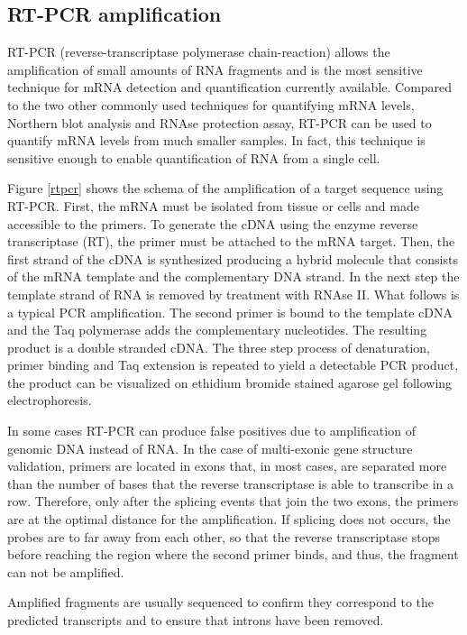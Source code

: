 \subsection{RT-PCR amplification}

RT-PCR (reverse-transcriptase polymerase chain-reaction) allows the
amplification of small amounts of RNA fragments and is the most
sensitive technique for mRNA detection and quantification currently
available. Compared to the two other commonly used techniques for
quantifying mRNA levels, Northern blot analysis and RNAse protection
assay, RT-PCR can be used to quantify mRNA levels from much smaller
samples. In fact, this technique is sensitive enough to enable
quantification of RNA from a single cell.

Figure \ref{rtpcr} shows the schema of the amplification of a target
sequence using RT-PCR. First, the mRNA must be isolated from tissue or
cells and made accessible to the primers. To generate the cDNA using
the enzyme reverse transcriptase (RT), the primer must be attached to
the mRNA target. Then, the first strand of the cDNA is synthesized
producing a hybrid molecule that consists of the mRNA template and the
complementary DNA strand.  In the next step the template strand of RNA
is removed by treatment with RNAse II. What follows is a typical PCR
amplification. The second primer is bound to the template cDNA and the
Taq polymerase adds the complementary nucleotides. The resulting
product is a double stranded cDNA. The three step process of
denaturation, primer binding and Taq extension is repeated to yield a
detectable PCR product, the product can be visualized on ethidium
bromide stained agarose gel following electrophoresis.

In some cases RT-PCR can produce false positives due to amplification
of genomic DNA instead of RNA. In the case of multi-exonic gene
structure validation, primers are located in exons that, in most
cases, are separated more than the number of bases that the reverse
transcriptase is able to transcribe in a row. Therefore, only after
the splicing events that join the two exons, the primers are at the
optimal distance for the amplification.  If splicing does not occurs,
the probes are to far away from each other, so  that the reverse
transcriptase stops before reaching the region where the second primer
binds, and thus, the fragment can not be amplified.

Amplified fragments are usually sequenced to confirm they correspond
to the predicted transcripts and to ensure that introns have been
removed.

